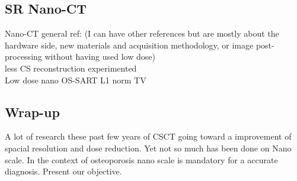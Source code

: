 \subsection{SR Nano-CT}
	Nano-CT general ref: \cite{[23]} (I can have other references but are mostly about the hardware side, new materials and acquisition methodology, or image post-processing without having used low dose)\\
	less CS reconstruction experimented	\\
	Low dose nano OS-SART L1 norm TV \cite{[10]}

\subsection{Wrap-up}
	A lot of research these past few years of CSCT going toward a improvement of spacial resolution and dose reduction. Yet not so much has been done on Nano scale. In the context of osteoporosis nano scale is mandatory for a accurate diagnosis. Present our objective.

